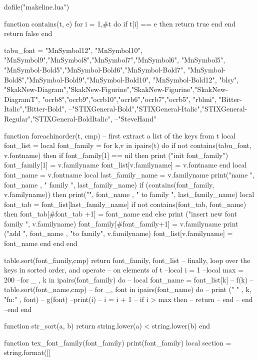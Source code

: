 \documentclass[12pt,a4paper]{article}
\begin{document}
\begin{luacode*}

dofile("makeline.lua")

function contains(t, e)
	for i = 1,#t do
		if t[i] == e then return true end
	end
	return false
end

tabu_font = {
"MnSymbol12", "MnSymbol10", "MnSymbol9","MnSymbol8","MnSymbol7","MnSymbol6", "MnSymbol5",
"MnSymbol-Bold5","MnSymbol-Bold6","MnSymbol-Bold7", "MnSymbol-Bold8","MnSymbol-Bold9","MnSymbol-Bold10", "MnSymbol-Bold12",
"blsy",
"SkakNew-Diagram","SkakNew-Figurine","SkakNew-Figurine","SkakNew-DiagramT",
"ocrb8","ocrb9","ocrb10","ocrb6","ocrb7","ocrb5",
"rblmi",
"Bitter-Italic","Bitter-Bold",
--"STIXGeneral-Bold","STIXGeneral-Italic","STIXGeneral-Regular","STIXGeneral-BoldItalic",
--"SteveHand"
}

function foreachinorder(t, cmp)
    -- first extract a list of the keys from t
    local font_list = {}
    local font_family = {}
    for k,v in ipairs(t) do
		if not contains(tabu_font, v.fontname) then
			if font_family[1] == nil then
				print ("init font_family")
				font_family[1] = v.familyname
				font_list[v.familyname] = {v.fontname}
			end
			local font_name = v.fontname
			local last_family_name = v.familyname
			print("name ", font_name , " family ", last_family_name)
			if (contains(font_family, v.familyname)) then
				print("", font_name , " to family ", last_family_name)
				local font_tab = font_list[last_family_name]
				if not contains(font_tab, font_name) then
					font_tab[#font_tab +1] = font_name
				end
			else
				print ("insert new font family ", v.familyname)
				font_family[#font_family+1] = v.familyname
				print ("add ", font_name , "to family", v.familyname)
				font_list[v.familyname] = {font_name}
			end
		end
    end
    
    table.sort(font_family,cmp)
    return font_family, font_list
    -- finally, loop over the keys in sorted order, and operate
    -- on elements of t
    --local i = 1
    --local max = 200
    --for _ , k in ipairs(font_family) do
	--	local font_name = font_list[k]
	--	f(k)
	--	table.sort(font_name,cmp)
	--	for _, font in ipairs(font_name) do
			-- print (" " , k, "fn:" , font)
	--		g(font)
			--print(i)
	--		i = i + 1
	--		if i > max then 
	--			return
	--		end
	--	end
    --end
end

function str_sort(a, b)
	return string.lower(a) < string.lower(b)
end


function tex_font_family(font_family)
	print(font_family)
	local section = string.format([[

\end{luacode*}
\end{document}
